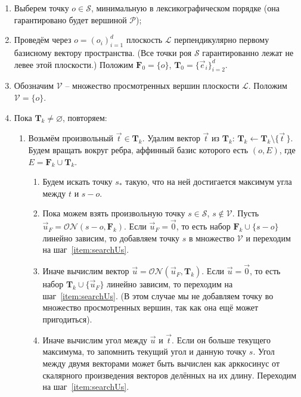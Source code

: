\documentclass[a4paper,12pt]{article}
\newcommand{\Swarm}{\mathcal{S}}              %
\newcommand{\Polytop}{\mathcal{P}}         %
\newcommand{\Viewed}{\mathcal{V}}             %
\newcommand{\ZVec}{\vec 0}                    %
\newcommand{\set}[2][]{#1\{ #2 #1\}}                    %
\newcommand{\ONorm}[3][]{\mathcal{ON}#1( #2, #3 #1)} %
\newcommand{\TempVec}{\mathbf{T}}  %
\newcommand{\FinalVec}{\mathbf{F}} %
\newcommand{\Plane}{\mathcal{L}}           %
\renewcommand{\.}{\hspace{0.2ex}}
\begin{document}
    \begin{enumerate}
      \item Выберем точку $o \in \Swarm$, минимальную в лексикографическом порядке (она гарантировано будет вершиной $\Polytop$);


      \item Проведём через $o=(o_i)_{i = 1}^{d}$ плоскость $\Plane$ перпендикулярно первому базисному вектору пространства. (Все точки роя $\Swarm$ гарантированно лежат не левее этой плоскости.) Положим $\FinalVec_0 = \set{o}$, $\TempVec_0 = \set{\vec e_i}_{i=2}^d$.


      \item Обозначим $\Viewed$ -- множество просмотренных вершин плоскости $\Plane$. Положим $\Viewed =\set{o}$.


      \item Пока $\TempVec_k \neq \varnothing$, повторяем:


      \begin{enumerate}
        \item Возьмём произвольный $\vec t \in \TempVec_k$. Удалим вектор $\vec t$ из $\TempVec_k$: $\TempVec_k \leftarrow \TempVec_k \setminus \set{\vec t \,}$. Будем вращать вокруг ребра, аффинный базис которого есть $(o, E)$, где $E = \FinalVec_k \cup \TempVec_k$.


        \begin{enumerate}
          \item Будем искать точку $s_*$ такую, что на ней достигается максимум угла между $t$ и $s - o$.


          \item Пока можем взять произвольную точку $s \in \Swarm$, $s \notin \Viewed$. Пусть $\vec u_F = \ONorm{s - o}{\FinalVec_k}$. Если $\vec u_F = \ZVec$, то есть набор $\FinalVec_k \cup \set{s - o}$ линейно зависим, то добавляем точку $s$ в множество $\Viewed$ и переходим на шаг~\ref{item:searchUs}.
          \label{item:searchUs}


          \item Иначе вычислим вектор $\vec u = \ONorm{\vec u_F}{\TempVec_k}$. Если $\vec u = \ZVec$, то есть набор $\TempVec_k \cup \set{\vec u_F}$ линейно зависим, то переходим на шаг~\ref{item:searchUs}. (В этом случае мы не добавляем точку во множество просмотренных вершин, так как она ещё может пригодиться).


          \item Иначе вычислим угол между $\vec u$ и $\vec t$. Если он больше текущего максимума, то запомнить текущий угол и данную точку $s$. Угол между двумя векторами может быть вычислен как арккосинус от скалярного произведения векторов делённых на их длину. Переходим на шаг~\ref{item:searchUs}.
        \end{enumerate}



\end{enumerate}
\end{enumerate}
\end{document}
